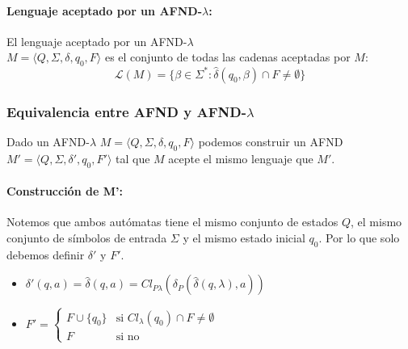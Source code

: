 \paragraph{Lenguaje aceptado por un AFND-\(\lambda\):} El lenguaje aceptado por un AFND-\(\lambda\) \\ \(M = \langle Q,\Sigma,\delta,q_0,F\rangle\) es el conjunto de todas las cadenas aceptadas por \(M\):
\[\mathcal{L}(M) = \{\beta \in \Sigma^* : \hat\delta(q_0,\beta)\cap F \neq \emptyset\}\]

\subsubsection{Equivalencia entre AFND y AFND-\texorpdfstring{\(\lambda\)}{lambda}}
\label{sec:afd-afd-lambda}
Dado un AFND-\(\lambda\) \(M =\langle Q,\Sigma,\delta,q_0,F\rangle\) podemos construir un AFND \(M' =\langle Q,\Sigma,\delta',q_0,F'\rangle\) tal que \(M\) acepte el mismo lenguaje que \(M'\).

\paragraph{Construcción de M':} Notemos que ambos autómatas tiene el mismo conjunto de estados \(Q\), el mismo conjunto de símbolos de entrada \(\Sigma\) y el mismo estado inicial \(q_0\). Por lo que solo debemos definir \(\delta'\) y \(F'\).
\begin{itemize}
  \item \(\delta'(q,a) = \hat\delta(q, a) = Cl_{P\lambda}\left(\delta_P(\hat\delta(q,\lambda), a)\right)\)
  \item \(
        F' = \begin{cases}
          F\cup\{q_0\} & \text{si } Cl_{\lambda}(q_0)\cap F \neq \emptyset \\
          F            & \text{si no}
        \end{cases}\)
\end{itemize}

